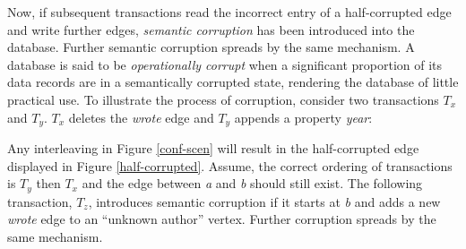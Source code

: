 Now, if subsequent transactions read the incorrect entry of a half-corrupted edge and write further edges, \emph{semantic corruption} has been introduced into the database. Further semantic corruption spreads by the same mechanism. A database is said to be \emph{operationally corrupt} when a significant proportion of its data records are in a semantically corrupted state, rendering the database of little practical use. To illustrate the process of corruption, consider two transactions $T_x$ and $T_y$. $T_x$ deletes the \emph{wrote} edge and $T_y$ appends a property \emph{year}:

Any interleaving in Figure \ref{conf-scen} will result in the half-corrupted edge displayed in Figure \ref{half-corrupted}. Assume, the correct ordering of transactions is $T_y$ then $T_x$ and the edge between \emph{a} and \emph{b} should still exist. The following transaction, $T_z$, introduces semantic corruption if it starts at \emph{b} and adds a new \emph{wrote} edge to an ``unknown author'' vertex. Further corruption spreads by the same mechanism.


